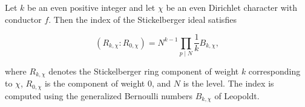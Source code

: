 Let $k$ be an even positive integer and let $\chi$ be an even Dirichlet character with conductor $f$. Then the index of the Stickelberger ideal satisfies

$$
(R_{k,\chi} : R_{0,\chi}) = N^{k-1} \prod_{p \mid N} \frac{1}{k} B_{k,\chi},
$$

where $R_{k,\chi}$ denotes the Stickelberger ring component of weight $k$ corresponding to $\chi$, $R_{0,\chi}$ is the component of weight $0$, and $N$ is the level. The index is computed using the generalized Bernoulli numbers $B_{k,\chi}$ of Leopoldt.